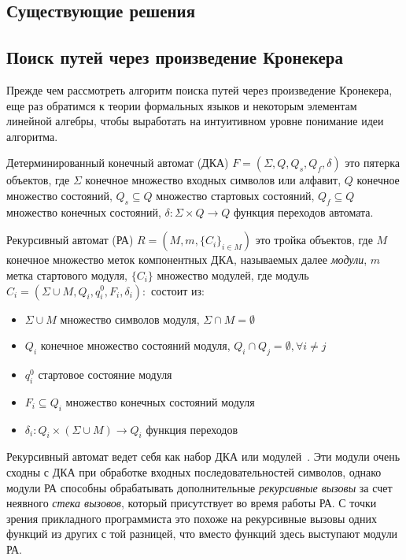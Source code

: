 \documentclass[14pt]{matmex-diploma-custom}
\begin{document}
\subsection{Существующие решения}

\subsection{Поиск путей через произведение Кронекера}

Прежде чем рассмотреть алгоритм поиска путей через произведение Кронекера, еще раз обратимся к теории формальных языков и некоторым элементам линейной алгебры, чтобы выработать на интуитивном уровне понимание идеи алгоритма.

Детерминированный конечный автомат (ДКА) $F = (\Sigma, Q, Q_s, Q_f, \delta)$ это пятерка объектов, где $\Sigma$ конечное множество входных символов или алфавит, $Q$ конечное множество состояний, $Q_s \subseteq Q$ множество стартовых состояний, $Q_f \subseteq Q$ множество конечных состояний, $\delta : \Sigma \times Q \rightarrow Q$ функция переходов автомата.

Рекурсивный автомат (РА) $R = (M, m, \{C_i\}_{i \in M})$ это тройка объектов, где $M$ конечное множество меток компонентных ДКА, называемых далее \textit{модули}, $m$ метка стартового модуля, $\{C_i\}$ множество модулей, где модуль $C_i = (\Sigma \cup M, Q_i, q_i^0, F_i, \delta _i): $ состоит из:

\begin{itemize}
    \item $\Sigma \cup M$ множество символов модуля, $\Sigma \cap M = \emptyset$
    \item $Q_i$ конечное множество состояний модуля, $Q_i \cap Q_j = \emptyset, \forall i \neq j$
    \item $q_i^0$ стартовое состояние модуля
    \item $F_i \subseteq Q_i$ множество конечных состояний модуля 
    \item $\delta_i : Q_i \times (\Sigma \cup M) \rightarrow Q_i$ функция переходов
\end{itemize}

Рекурсивный автомат ведет себя как набор ДКА или модулей~\cite{article:recursive_state_machines}. Эти модули очень сходны с ДКА при обработке входных последовательностей символов, однако модули РА способны обрабатывать дополнительные \textit{рекурсивные вызовы} за счет неявного \textit{стека вызовов}, который присутствует во время работы РА. С точки зрения прикладного программиста это похоже на рекурсивные вызовы одних функций из других с той разницей, что вместо функций здесь выступают модули РА.
\end{document}
